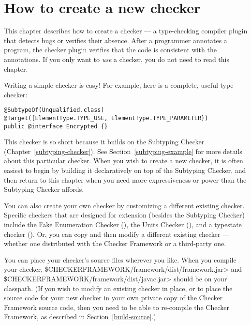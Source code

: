\htmlhr
\chapter{How to create a new checker\label{writing-a-checker}}

\newcommand{\TreeAPIBase}{https://docs.oracle.com/javase/8/docs/jdk/api/javac/tree/com/sun/source}
\newcommand{\refTreeclass}[2]{\href{\TreeAPIBase{}/#1/#2.html?is-external=true}{\<#2>}}
\newcommand{\ModelAPIBase}{http://docs.oracle.com/javase/8/docs/api/javax/lang/model}
\newcommand{\refModelclass}[2]{\href{\ModelAPIBase{}/#1/#2.html?is-external=true}{\<#2>}}

This chapter describes how to create a checker
--- a type-checking compiler plugin that detects bugs or verifies their
absence.  After a programmer annotates a program,
the checker plugin verifies that the code is consistent
with the annotations.
If you only want to \emph{use} a checker, you do not need to read this
chapter.


Writing a simple checker is easy!  For example, here is a complete, useful
type-checker:

\begin{Verbatim}
@SubtypeOf(Unqualified.class)
@Target({ElementType.TYPE_USE, ElementType.TYPE_PARAMETER})
public @interface Encrypted {}
\end{Verbatim}

This checker is so short because it builds on the Subtyping Checker
(Chapter~\ref{subtyping-checker}).
See Section~\ref{subtyping-example} for more details about this particular checker.
When you wish to create a new checker, it is often easiest to begin by
building it declaratively on top of the Subtyping Checker, and then return to
this chapter when you need more expressiveness or power than the Subtyping
Checker affords.

You can also create your own checker by customizing a different existing
checker.  Specific checkers that are designed for extension (besides the Subtyping
Checker) include the Fake Enumeration Checker
(), the Units Checker
(), and a typestate checker
().
Or, you can copy and then modify a different existing checker --- whether
one distributed with the Checker Framework or a third-party one.

\begin{sloppypar}
You can place your checker's source files wherever you like.  When you
compile your checker, \<\$CHECKERFRAMEWORK/framework/dist/framework.jar> and \<\$CHECKERFRAMEWORK/framework/dist/javac.jar>
should be on your classpath.  (If you wish to modify an existing checker in place,
or to place the source code for your new checker in your own private copy of the
Checker Framework source code, then you need to be able to re-compile the
Checker Framework, as described in Section~\ref{build-source}.)
\end{sloppypar}


